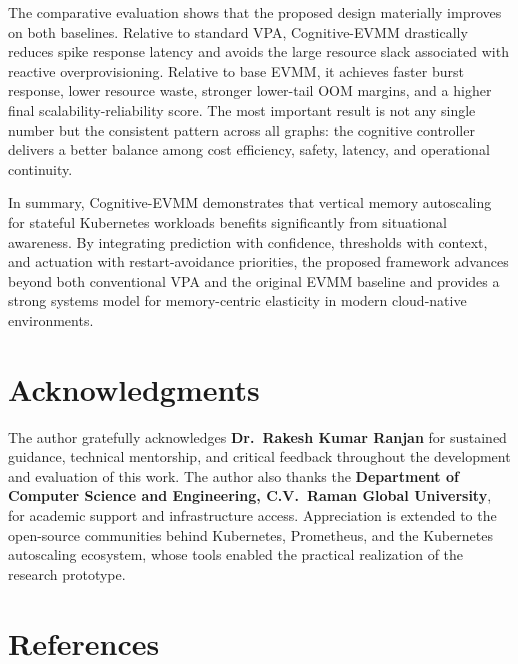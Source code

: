 \documentclass[12pt,a4paper]{article}
\begin{document}
The comparative evaluation shows that the proposed design materially improves on both baselines. Relative to standard VPA, Cognitive-EVMM drastically reduces spike response latency and avoids the large resource slack associated with reactive overprovisioning. Relative to base EVMM, it achieves faster burst response, lower resource waste, stronger lower-tail OOM margins, and a higher final scalability-reliability score. The most important result is not any single number but the consistent pattern across all graphs: the cognitive controller delivers a better balance among cost efficiency, safety, latency, and operational continuity.

In summary, Cognitive-EVMM demonstrates that vertical memory autoscaling for stateful Kubernetes workloads benefits significantly from situational awareness. By integrating prediction with confidence, thresholds with context, and actuation with restart-avoidance priorities, the proposed framework advances beyond both conventional VPA and the original EVMM baseline and provides a strong systems model for memory-centric elasticity in modern cloud-native environments.

\clearpage
\section*{Acknowledgments}

The author gratefully acknowledges \textbf{Dr.\ Rakesh Kumar Ranjan} for sustained guidance, technical mentorship, and critical feedback throughout the development and evaluation of this work. The author also thanks the \textbf{Department of Computer Science and Engineering, C.V.\ Raman Global University}, for academic support and infrastructure access. Appreciation is extended to the open-source communities behind Kubernetes, Prometheus, and the Kubernetes autoscaling ecosystem, whose tools enabled the practical realization of the research prototype.

\clearpage
\section*{References}
\thispagestyle{plain}
\end{document}
